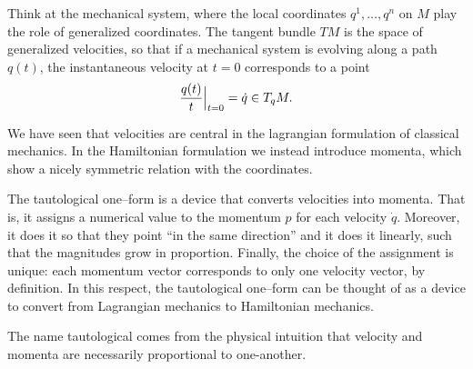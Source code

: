 \documentclass[english,fontsize=11pt,paper=a5,oneside]{scrbook}
\let\d\relax
\newcommand{\d}{\mathrm{d}}
\theoremstyle{definition}
\newenvironment{remark}
  {\pushQED{\qed}\renewcommand{\qedsymbol}{$\lozenge$}\remarkx}
  {\popQED\endremarkx}
\begin{document}
\begin{remark}
  Think at the mechanical system, where the local coordinates $q^1, \ldots, q^n$ on $M$ play the role of generalized coordinates. The tangent bundle $TM$ is the space of generalized velocities, so that if a mechanical system is evolving along a path $q(t)$, the instantaneous velocity at $t = 0$ corresponds to a point
  \begin{equation}
    \frac {\d q(t)}{\d t}\Big|_{t=0} = \dot {q} \in T_qM.
  \end{equation}

  We have seen that velocities are central in the lagrangian formulation of classical mechanics.
  In the Hamiltonian formulation we instead introduce momenta, which show a nicely symmetric relation with the coordinates.

  The tautological one--form is a device that converts velocities into momenta.
  That is, it assigns a numerical value to the momentum $p$ for each velocity $\dot {q}$.
  Moreover, it does it so that they point ``in the same direction'' and it does it linearly, such that the magnitudes grow in proportion.
  Finally, the choice of the assignment is unique: each momentum vector corresponds to only one velocity vector, by definition.
  In this respect, the tautological one--form can be thought of as a device to convert from Lagrangian mechanics to Hamiltonian mechanics.

  The name tautological comes from the physical intuition that velocity and momenta are necessarily proportional to one-another.
\end{remark}
\end{document}
